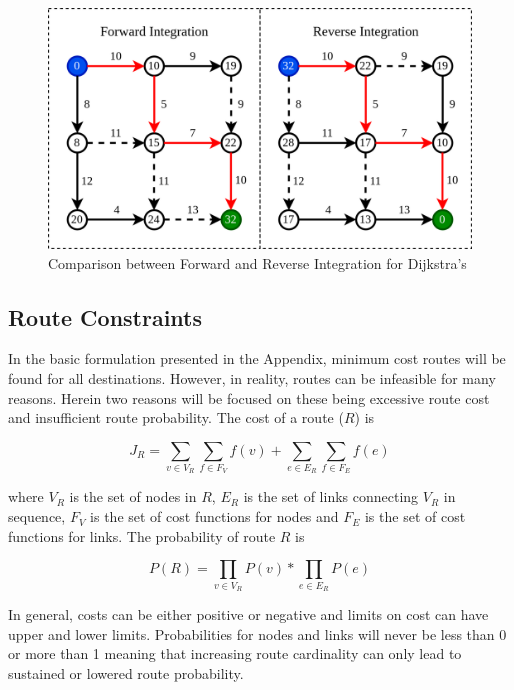\begin{figure}[H]
	\centering
	\includegraphics[width = \linewidth]{figs/routing_diagram.png}
	\caption{Comparison between Forward and Reverse Integration for Dijkstra's}
	\label{fig:dijkstra}
\end{figure}


\subsection{Route Constraints}

In the basic formulation presented in the Appendix, minimum cost routes will be found for all destinations. However, in reality, routes can be infeasible for many reasons. Herein two reasons will be focused on these being excessive route cost and insufficient route probability. The cost of a route ($R$) is

\begin{equation}
	J_R = \sum_{v\in V_R}\sum_{f\in F_V} f(v) + \sum_{e\in E_R}\sum_{f\in F_E} f(e)
\end{equation}

where $V_R$ is the set of nodes in $R$, $E_R$ is the set of links connecting $V_R$ in sequence, $F_V$ is the set of cost functions for nodes and $F_E$ is the set of cost functions for links. The probability of route $R$ is

\begin{equation}
	P(R) = \prod_{v\in V_R}P(v) * \prod_{e\in E_R}P(e)
\end{equation}

In general, costs can be either positive or negative and limits on cost can have upper and lower limits. Probabilities for nodes and links will never be less than 0 or more than 1 meaning that increasing route cardinality can only lead to sustained or lowered route probability.

